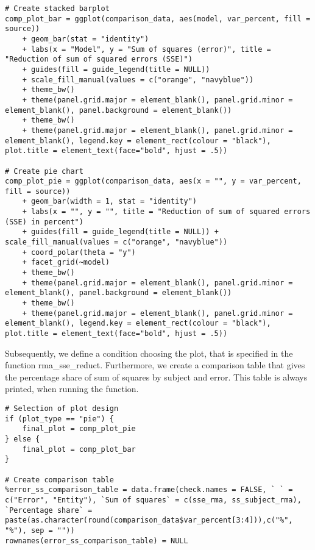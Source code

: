 \documentclass[11pt]{article}
\begin{document}
		
\begin{lstlisting}  		
# Create stacked barplot 
comp_plot_bar = ggplot(comparison_data, aes(model, var_percent, fill = source)) 
	+ geom_bar(stat = "identity") 
	+ labs(x = "Model", y = "Sum of squares (error)", title = "Reduction of sum of squared errors (SSE)") 
	+ guides(fill = guide_legend(title = NULL)) 
	+ scale_fill_manual(values = c("orange", "navyblue")) 
	+ theme_bw() 
	+ theme(panel.grid.major = element_blank(), panel.grid.minor = element_blank(), panel.background = element_blank()) 
	+ theme_bw() 
	+ theme(panel.grid.major = element_blank(), panel.grid.minor = element_blank(), legend.key = element_rect(colour = "black"), plot.title = element_text(face="bold", hjust = .5))

# Create pie chart    
comp_plot_pie = ggplot(comparison_data, aes(x = "", y = var_percent, fill = source)) 
	+ geom_bar(width = 1, stat = "identity") 
	+ labs(x = "", y = "", title = "Reduction of sum of squared errors (SSE) in percent") 
	+ guides(fill = guide_legend(title = NULL)) + scale_fill_manual(values = c("orange", "navyblue")) 
	+ coord_polar(theta = "y") 
	+ facet_grid(~model) 
	+ theme_bw() 
	+ theme(panel.grid.major = element_blank(), panel.grid.minor = element_blank(), panel.background = element_blank()) 
	+ theme_bw() 
	+ theme(panel.grid.major = element_blank(), panel.grid.minor = element_blank(), legend.key = element_rect(colour = "black"), plot.title = element_text(face="bold", hjust = .5))

\end{lstlisting}      
    
				Subsequently, we define a condition choosing the plot, that is specified in the function rma_sse_reduct. Furthermore, we create a comparison table that gives the percentage share of sum of squares by subject and error. This table is always printed, when running the function.
    
\begin{lstlisting}  
# Selection of plot design    
if (plot_type == "pie") {
	final_plot = comp_plot_pie
} else {
	final_plot = comp_plot_bar
}
    
# Create comparison table
%error_ss_comparison_table = data.frame(check.names = FALSE, ` ` = c("Error", "Entity"), `Sum of squares` = c(sse_rma, ss_subject_rma), `Percentage share` = paste(as.character(round(comparison_data$var_percent[3:4])),c("%", "%"), sep = ""))
rownames(error_ss_comparison_table) = NULL
\end{lstlisting}
    
\end{document}
